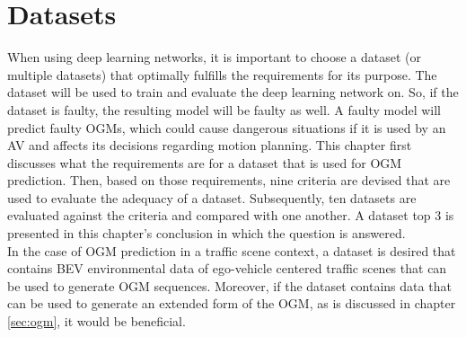\section{Datasets} \label{sec:datasets}

When using deep learning networks, it is important to choose a dataset (or multiple datasets) that optimally fulfills the requirements for its purpose. The dataset will be used to train and evaluate the deep learning network on. So, if the dataset is faulty, the resulting model will be faulty as well. A faulty model will predict faulty \glspl{OGM}, which could cause dangerous situations if it is used by an \gls{AV} and affects its decisions regarding motion planning. This chapter first discusses what the requirements are for a dataset that is used for \gls{OGM} prediction. Then, based on those requirements, nine criteria are devised that are used to evaluate the adequacy of a dataset. Subsequently, ten datasets are evaluated against the criteria and compared with one another. A dataset top 3 is presented in this chapter's conclusion in which the question  is answered. \\

In the case of \gls{OGM} prediction in a traffic scene context, a dataset is desired that contains \gls{BEV} environmental data of ego-vehicle centered traffic scenes that can be used to generate \gls{OGM} sequences. Moreover, if the dataset contains data that can be used to generate an extended form of the \gls{OGM}, as is discussed in chapter \ref{sec:ogm}, it would be beneficial. \\


